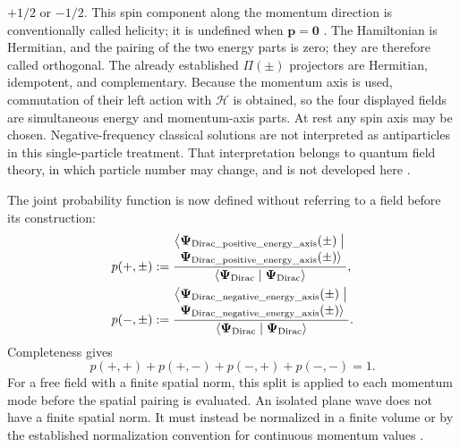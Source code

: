 \documentclass[10pt,letterpaper]{article}
\let\STAamsmathtext\text
\newcommand{\eqtext}[1]{\STAamsmathtext{\normalfont\rmfamily #1}}
\renewcommand{\text}[1]{\STAamsmathtext{\normalfont\rmfamily #1}}
\newcommand{\pv}[1]{#1}
\newcommand{\vct}[1]{\mathbf{#1}}
\newcommand{\bPsi}{\pv{\bm{\Psi}}}
\begin{document}
\(+1/2\) or \(-1/2\). This spin component along the momentum direction is
conventionally called helicity; it is undefined when
\(\vct{p}=\vct{0}\) \cite{sakurai2017}.
The Hamiltonian is Hermitian, and the pairing of the two energy parts is
zero; they are therefore called orthogonal. The
already established \(\pv{\Pi}(\pm)\) projectors are Hermitian,
idempotent, and complementary. Because the momentum axis is used, commutation
of their left action with \(\mathcal H\) is obtained, so the four
displayed fields are simultaneous energy and momentum-axis parts. At rest any spin axis may
be chosen. Negative-frequency classical solutions are not interpreted as
antiparticles in this single-particle treatment. That interpretation belongs
to quantum field theory, in which particle number may change, and is not
developed here \cite{greiner2000}.

The joint probability function is now defined without referring to a field
before its construction:
\begin{equation}
\begin{aligned}
p(+,\pm)
&:=
\frac{
\begin{gathered}
\left\langle
\bPsi_{\eqtext{Dirac\_positive\_energy\_axis}}(\pm)
\mathrel{\big|}\right.\\[-0.2em]
\left.
\bPsi_{\eqtext{Dirac\_positive\_energy\_axis}}(\pm)
\right\rangle
\end{gathered}
}{
\langle\bPsi_{\eqtext{Dirac}}\mid\bPsi_{\eqtext{Dirac}}\rangle
},
\\
p(-,\pm)
&:=
\frac{
\begin{gathered}
\left\langle
\bPsi_{\eqtext{Dirac\_negative\_energy\_axis}}(\pm)
\mathrel{\big|}\right.\\[-0.2em]
\left.
\bPsi_{\eqtext{Dirac\_negative\_energy\_axis}}(\pm)
\right\rangle
\end{gathered}
}{
\langle\bPsi_{\eqtext{Dirac}}\mid\bPsi_{\eqtext{Dirac}}\rangle
}.
\end{aligned}
\label{eq:dirac-projector-probability}
\end{equation}
Completeness gives
\begin{equation}
p(+,+)+p(+,-)+p(-,+)+p(-,-)=1.
\label{eq:dirac-probability-sum}
\end{equation}
For a free field with a finite spatial norm, this split is applied to each
momentum mode before the spatial pairing is evaluated. An isolated plane wave
does not have a finite spatial norm. It must instead be normalized in a
finite volume or by the established normalization convention for continuous
momentum values \cite{sakurai2017}.
\end{document}
